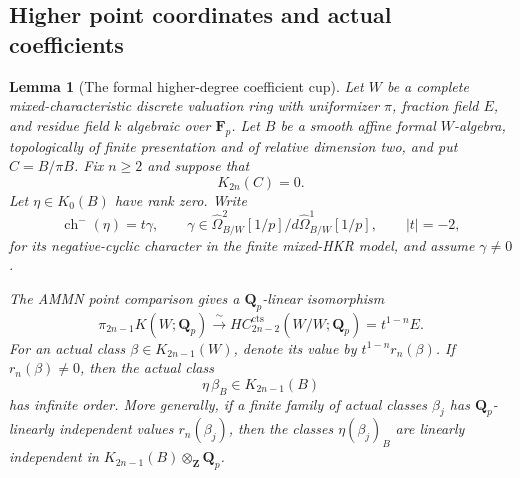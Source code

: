 \documentclass[11pt,a4paper]{article}
\newtheorem{lemma}[theorem]{Lemma}
\theoremstyle{remark}
\begin{document}
\subsection{Higher point coordinates and actual coefficients}
\label{sec:higherpointcoordinates}


\begin{lemma}[The formal higher-degree coefficient cup]
\label{lem:formalhigherTCcup}
Let $W$ be a complete mixed-characteristic discrete valuation ring
with uniformizer $\pi$, fraction field $E$, and residue field $k$
algebraic over $\mathbf F_p$. Let $B$ be a smooth affine formal
$W$-algebra, topologically of finite presentation and of relative
dimension two, and put $C=B/\pi B$.
Fix $n\geq2$ and suppose that
\[
 K_{2n}(C)=0.
\]
Let $\eta\in K_0(B)$ have rank zero. Write
\[
 \operatorname{ch}^-(\eta)=t\gamma,
 \qquad
 \gamma\in\widehat\Omega^2_{B/W}[1/p]
               /d\widehat\Omega^1_{B/W}[1/p],
 \qquad |t|=-2,
\]
for its negative-cyclic character in the finite mixed-HKR model,
and assume $\gamma\ne0$.

The AMMN point comparison gives a $\mathbf Q_p$-linear isomorphism
\[
 \pi_{2n-1}K(W;\mathbf Q_p)
       \xrightarrow{\ \sim\ }
 HC_{2n-2}^{\mathrm{cts}}(W/W;\mathbf Q_p)
       =t^{1-n}E.
\]
For an actual class $\beta\in K_{2n-1}(W)$, denote its value by
$t^{1-n}r_n(\beta)$. If $r_n(\beta)\ne0$, then the actual class
\[
                  \eta\,\beta_B\in K_{2n-1}(B)
\]
has infinite order. More generally, if a finite family of actual
classes $\beta_j$ has $\mathbf Q_p$-linearly independent values
$r_n(\beta_j)$, then the classes $\eta(\beta_j)_B$ are linearly
independent in $K_{2n-1}(B)\otimes_{\mathbf Z}\mathbf Q_p$.
\end{lemma}
\end{document}
